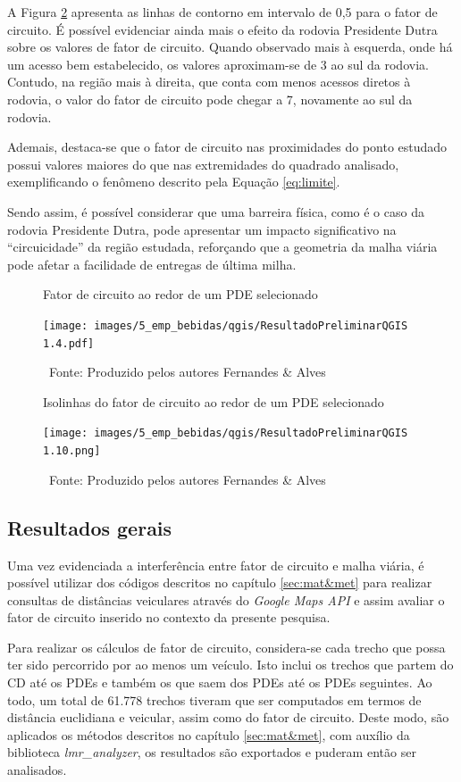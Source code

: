 A Figura \ref{fig:FC_1ponto_iso} apresenta as linhas de contorno em intervalo de 0,5 para o fator de circuito.
É possível evidenciar ainda mais o efeito da rodovia Presidente Dutra sobre os valores de fator de circuito.
Quando observado mais à esquerda, onde há um acesso bem estabelecido, os valores aproximam-se de 3 ao sul da rodovia.
Contudo, na região mais à direita, que conta com menos acessos diretos à rodovia, o valor do fator de circuito pode chegar a 7, novamente ao sul da rodovia. 

Ademais, destaca-se que o fator de circuito nas proximidades do ponto estudado possui valores maiores do que nas extremidades do quadrado analisado, exemplificando o fenômeno descrito pela Equação \ref{eq:limite}. 

Sendo assim, é possível considerar que uma barreira física, como é o caso da rodovia Presidente Dutra, pode apresentar um impacto significativo na ``circuicidade'' da região estudada, reforçando que a geometria da malha viária pode afetar a facilidade de entregas de última milha.

\begin{figure}[H]
    \centering
    \caption{Fator de circuito ao redor de um PDE selecionado}
    \texttt{[image: images/5\_emp\_bebidas/qgis/ResultadoPreliminarQGIS 1.4.pdf]}
    \caption*{\ Fonte: Produzido pelos autores Fernandes \& Alves}
    \label{fig:FC_1ponto}
\end{figure}

\begin{figure}[H]
    \centering
    \caption{Isolinhas do fator de circuito ao redor de um PDE selecionado}
    \texttt{[image: images/5\_emp\_bebidas/qgis/ResultadoPreliminarQGIS 1.10.png]}
    \caption*{\ Fonte: Produzido pelos autores Fernandes \& Alves}
    \label{fig:FC_1ponto_iso}
\end{figure}

\subsection{Resultados gerais}

Uma vez evidenciada a interferência entre fator de circuito e malha viária, é possível utilizar dos códigos descritos no capítulo \ref{sec:mat&met} para realizar consultas de distâncias veiculares através do \textit{Google Maps API} e assim avaliar o fator de circuito inserido no contexto da presente pesquisa.

Para realizar os cálculos de fator de circuito, considera-se cada trecho que possa ter sido percorrido por ao menos um veículo. 
Isto inclui os trechos que partem do CD até os PDEs e também os que saem dos PDEs até os PDEs seguintes.
Ao todo, um total de 61.778 trechos tiveram que ser computados em termos de distância euclidiana e veicular, assim como do fator de circuito.
Deste modo, são aplicados os métodos descritos no capítulo \ref{sec:mat&met}, com auxílio da biblioteca \textit{lmr\_analyzer}, os resultados são exportados e puderam então ser analisados.

